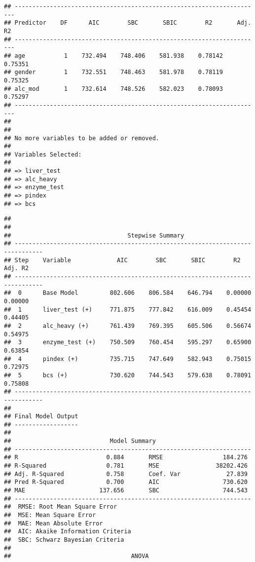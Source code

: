 \documentclass[
]{article}
\begin{document}
\begin{verbatim}
## ----------------------------------------------------------------------
## Predictor    DF      AIC        SBC       SBIC        R2       Adj. R2 
## ----------------------------------------------------------------------
## age           1    732.494    748.406    581.938    0.78142    0.75351 
## gender        1    732.551    748.463    581.978    0.78119    0.75325 
## alc_mod       1    732.614    748.526    582.023    0.78093    0.75297 
## ----------------------------------------------------------------------
## 
## 
## No more variables to be added or removed.
## 
## Variables Selected: 
## 
## => liver_test 
## => alc_heavy 
## => enzyme_test 
## => pindex 
## => bcs
\end{verbatim}

\begin{verbatim}
## 
## 
##                                 Stepwise Summary                                
## ------------------------------------------------------------------------------
## Step    Variable             AIC        SBC       SBIC        R2       Adj. R2 
## ------------------------------------------------------------------------------
##  0      Base Model         802.606    806.584    646.794    0.00000    0.00000 
##  1      liver_test (+)     771.875    777.842    616.009    0.45454    0.44405 
##  2      alc_heavy (+)      761.439    769.395    605.506    0.56674    0.54975 
##  3      enzyme_test (+)    750.509    760.454    595.297    0.65900    0.63854 
##  4      pindex (+)         735.715    747.649    582.943    0.75015    0.72975 
##  5      bcs (+)            730.620    744.543    579.638    0.78091    0.75808 
## ------------------------------------------------------------------------------
## 
## Final Model Output 
## ------------------
## 
##                            Model Summary                            
## -------------------------------------------------------------------
## R                         0.884       RMSE                 184.276 
## R-Squared                 0.781       MSE                38202.426 
## Adj. R-Squared            0.758       Coef. Var             27.839 
## Pred R-Squared            0.700       AIC                  730.620 
## MAE                     137.656       SBC                  744.543 
## -------------------------------------------------------------------
##  RMSE: Root Mean Square Error 
##  MSE: Mean Square Error 
##  MAE: Mean Absolute Error 
##  AIC: Akaike Information Criteria 
##  SBC: Schwarz Bayesian Criteria 
## 
##                                  ANOVA                                  

\end{verbatim}
\end{document}
